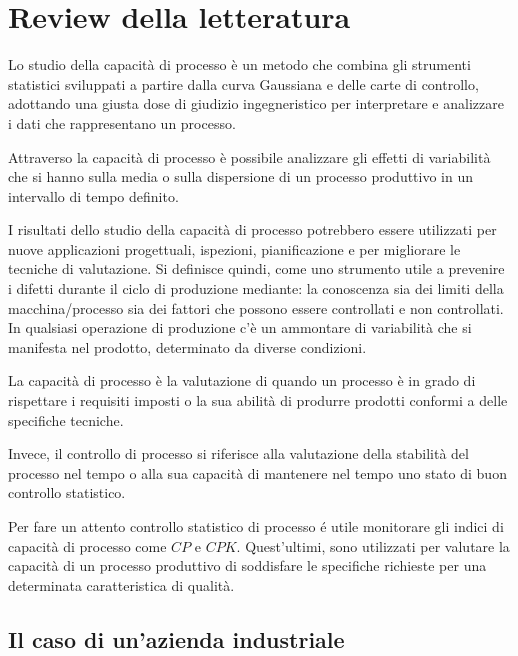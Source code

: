 \chapter{Review della letteratura}
\label{chap:Review della letteratura}



Lo studio della capacità di processo è un metodo che combina gli strumenti statistici sviluppati a partire dalla curva Gaussiana e delle carte di controllo, adottando una giusta dose di giudizio ingegneristico per interpretare e analizzare i dati che rappresentano un processo. 
\cite{wooluru2014process}


Attraverso la capacità di processo è possibile analizzare gli effetti di variabilità che si hanno sulla media o sulla dispersione di un processo produttivo in un intervallo di tempo definito.  


I risultati dello studio della capacità di processo potrebbero essere utilizzati per nuove applicazioni progettuali, ispezioni, pianificazione e per migliorare le tecniche di valutazione. 
Si definisce quindi, come uno strumento utile a prevenire i difetti durante il ciclo di produzione mediante: la conoscenza sia dei limiti della macchina/processo sia dei fattori che possono essere controllati e non controllati. 
In qualsiasi operazione di produzione c'è un ammontare di variabilità che si manifesta nel prodotto, determinato da diverse condizioni. 

La capacità di processo è la valutazione di quando un processo è in grado di rispettare i requisiti imposti o la sua abilità di produrre prodotti conformi a delle specifiche tecniche.

Invece, il controllo di processo si riferisce alla valutazione della stabilità del processo nel tempo o alla sua capacità di mantenere nel tempo uno stato di buon controllo statistico. 


Per fare un attento controllo statistico di processo é utile monitorare gli indici di capacità di processo come $CP$ e $CPK$. Quest'ultimi, sono utilizzati per valutare la capacità di un processo produttivo di soddisfare le specifiche richieste per una determinata caratteristica di qualità.
\cite{wooluru2014process}


\section{Il caso di un'azienda industriale}

